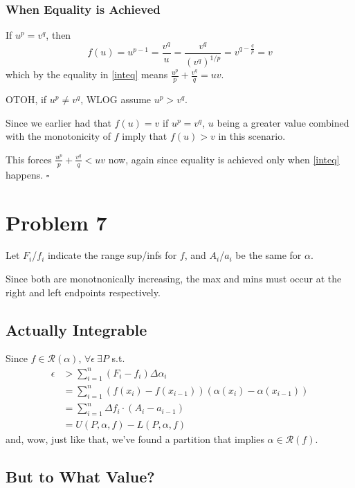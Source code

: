 \documentclass[12pt]{article}
\begin{document}
\subsubsection{When Equality is Achieved}

If $u^p=v^q$, then
\[f(u)=u^{p-1}=\frac{v^q}{u}=\frac{v^q}{\left(v^q\right)^{1/p}}=v^{q-\frac{q}{p}}=v\]
which by the equality in \eqref{inteq} means $\frac{u^p}{p}+\frac{v^q}{q} = uv$.

OTOH, if $u^p \ne v^q$, WLOG assume $u^p > v^q$.

Since we earlier had that $f(u)=v$ if $u^p=v^q$, $u$ being a greater value
combined with the monotonicity of $f$ imply that $f(u) > v$ in this scenario.

This forces $\frac{u^p}{p}+\frac{v^q}{q} < uv$ now, again since
equality is achieved only when \eqref{inteq} happens. $\square$

\pagebreak

\section{Problem 7}

Let $F_i$/$f_i$ indicate the range sup/infs for $f$,
and $A_i$/$a_i$ be the same for $\alpha$.

Since both are monotnonically increasing, the max and mins must occur
at the right and left endpoints respectively.

\subsection{Actually Integrable}

Since $f \in \mathcal{R}(\alpha)$, $\forall \epsilon\ \exists P$ s.t.
\begin{align*}
  \epsilon & > \sum_{i=1}^{n} (F_i-f_i)\Delta \alpha_i                         \\
           & = \sum_{i=1}^{n} (f(x_i)-f(x_{i-1}))(\alpha(x_i)-\alpha(x_{i-1})) \\
           & = \sum_{i=1}^{n} \Delta f_i \cdot (A_i-a_{i-1})                   \\
           & = U(P, \alpha, f) - L(P, \alpha, f)
\end{align*}
and, wow, just like that, we've found a partition that implies $\alpha \in \mathcal{R}(f)$.

\subsection{But to What Value?}
\end{document}
